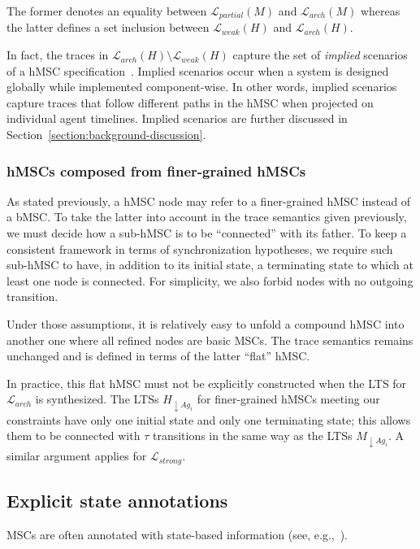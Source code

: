 The former denotes an equality between $\mathcal{L}_{partial}(M)$ and $\mathcal{L}_{arch}(M)$ whereas the latter defines a set inclusion between $\mathcal{L}_{weak}(H)$ and $\mathcal{L}_{arch}(H)$. 

In fact, the traces in $\mathcal{L}_{arch}(H) \setminus \mathcal{L}_{weak}(H)$ capture the set of \emph{implied} scenarios of a hMSC specification~\cite{Alur:2000, Uchitel:2004}. Implied scenarios occur when a system is designed globally while implemented component-wise. In other words, implied scenarios capture traces that follow different paths in the hMSC when projected on individual agent timelines. Implied scenarios are further discussed in Section~\ref{section:background-discussion}.

\subsubsection*{hMSCs composed from finer-grained hMSCs}

As stated previously, a hMSC node may refer to a finer-grained hMSC instead of a bMSC. To take the latter into account in the trace semantics given previously, we must decide how a sub-hMSC is to be ``connected'' with its father. To keep a consistent framework in terms of synchronization hypotheses, we require such sub-hMSC to have, in addition to its initial state, a terminating state to which at least one node is connected. For simplicity, we also forbid nodes with no outgoing transition. 

Under those assumptions, it is relatively easy to unfold a compound hMSC into another one where all refined nodes are basic MSCs. The trace semantics remains unchanged and is defined in terms of the latter ``flat'' hMSC. 

In practice, this flat hMSC must not be explicitly constructed when the LTS for $\mathcal{L}_{arch}$ is synthesized. The LTSs $H_{\downarrow Ag_i}$ for finer-grained hMSCs meeting our constraints have only one initial state and only one terminating state; this allows them to be connected with $\tau$ transitions in the same way as the LTSs $M_{\downarrow Ag_i}$. A similar argument applies for $\mathcal{L}_{strong}$.

\subsection{Explicit state annotations\label{subsection:background-scenario-annotations}}

MSCs are often annotated with state-based information (see, e.g.,~\cite{VanLamsweerde:1998, Kruger:2000, Whittle:2000}). 

